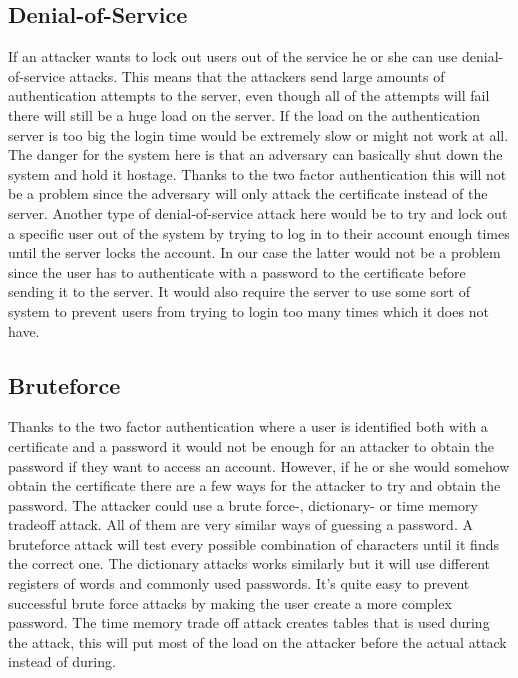 \documentclass{article}
\begin{document}
\subsection*{Denial-of-Service}

If an attacker wants to lock out users out of the service he or she can use denial-of-service attacks. This means that the attackers send large amounts of authentication attempts to the server, even though all of the attempts will fail there will still be a huge load on the server. If the load on the authentication server is too big the login time would be extremely slow or might not work at all. The danger for the system here is that an adversary can basically shut down the system and hold it hostage. Thanks to the two factor authentication this will not be a problem since the adversary will only attack the certificate instead of the server\cite[119]{stalbrown}. Another type of denial-of-service attack here would be to try and lock out a specific user out of the system by trying to log in to their account enough times until the server locks the account. In our case the latter would not be a problem since the user has to authenticate with a password to the certificate before sending it to the server. It would also require the server to use some sort of system to prevent users from trying to login too many times which it does not have. 

\subsection*{Bruteforce}

Thanks to the two factor authentication where a user is identified both with a certificate and a password it would not be enough for an attacker to obtain the password if they want to access an account. However, if he or she would somehow obtain the certificate there are a few ways for the attacker to try and obtain the password. The attacker could use a brute force-, dictionary- or time memory tradeoff attack. All of them are very similar ways of guessing a password. A bruteforce attack will test every possible combination of characters until it finds the correct one\cite[p.55]{stalbrown}. The dictionary attacks works similarly but it will use different registers of words and commonly used passwords. It’s quite easy to prevent successful brute force attacks by making the user create a more complex password. The time memory trade off attack creates tables that is used during the attack, this will put most of the load on the attacker before the actual attack instead of during\cite{hellman}.
\end{document}
